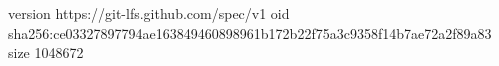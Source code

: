 version https://git-lfs.github.com/spec/v1
oid sha256:ce03327897794ae163849460898961b172b22f75a3c9358f14b7ae72a2f89a83
size 1048672
